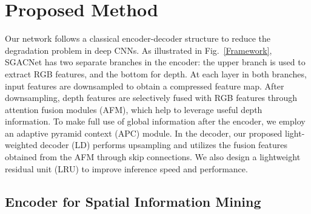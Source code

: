 \documentclass[journal,twoside,web]{ieeecolor}
\begin{document}
\section{Proposed Method}\label{sec:Proposed Method}
Our network follows a classical encoder-decoder structure to reduce the degradation problem in deep CNNs. As illustrated in Fig.~\ref{Framework}, SGACNet has two separate branches in the encoder: the upper branch is used to extract RGB features, and the bottom for depth. At each layer in both branches, input features are downsampled to obtain a compressed feature map. After downsampling, depth features are selectively fused with RGB features through attention fusion modules (AFM), which help to leverage useful depth information. To make full use of global information after the encoder, we employ an adaptive pyramid context (APC) module. In the decoder, our proposed light-weighted decoder (LD) performs upsampling and utilizes the fusion features obtained from the AFM through skip connections. We also design a lightweight residual unit (LRU) to improve inference speed and performance.

\subsection{Encoder for Spatial Information Mining}
\end{document}
